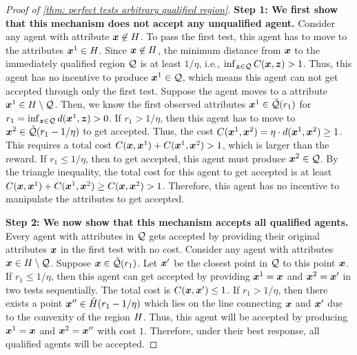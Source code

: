 \begin{proof}[Proof of \cref{thm: perfect tests arbitrary qualified region}]
    \textbf{Step 1: We first show that this mechanism does not accept any unqualified agent.}  Consider any agent with attribute $\boldsymbol{x} \not \in H$.
    To pass the first test, this agent has to move to the attributes $\boldsymbol{x}^1 \in H$. 
    Since $\boldsymbol{x} \not \in H$, the minimum distance from $\boldsymbol{x}$ to the immediately qualified region $\mathcal{Q}$ is at least $1/\eta$, i.e., $\inf_{\boldsymbol{z} \in \mathcal{Q}} C(\boldsymbol{x},\boldsymbol{z})  > 1$. 
    Thus, this agent has no incentive to produce $\boldsymbol{x}^1 \in \mathcal{Q}$, which means this agent can not get accepted through only the first test.
    Suppose the agent moves to a attribute $\boldsymbol{x}^1 \in H \setminus \mathcal{Q}$. Then, we know the first observed attributes $\boldsymbol{x}^1 \in \tilde {\mathcal{Q}}(r_1)$ for $r_1= \inf_{\boldsymbol{z} \in \mathcal{Q}} d(\boldsymbol{x}^1,\boldsymbol{z})  > 0$. If $r_1 > 1/\eta$, then this agent has to move to $\boldsymbol{x}^2 \in \tilde {\mathcal{Q}} (r_1 - 1/\eta)$ to get accepted. Thus, the cost $C(\boldsymbol{x}^1,\boldsymbol{x}^2) = \eta \cdot d(\boldsymbol{x}^1,\boldsymbol{x}^2) \geq 1$. This requires a total cost $C(\boldsymbol{x},\boldsymbol{x}^1) + C(\boldsymbol{x}^1,\boldsymbol{x}^2) > 1$, which is larger than the reward. If $r_1 \leq 1/\eta$, then to get accepted, this agent must produce $\boldsymbol{x}^2 \in \mathcal{Q}$. By the triangle inequality, the total cost for this agent to get accepted is at least $C(\boldsymbol{x},\boldsymbol{x}^1) + C(\boldsymbol{x}^1,\boldsymbol{x}^2) \geq C(\boldsymbol{x}, \boldsymbol{x}^2) > 1$. Therefore, this agent has no incentive to manipulate the attributes to get accepted. 

    \textbf{Step 2: We now show that this mechanism accepts all qualified agents.} Every agent with attributes in $\mathcal{Q}$ gets accepted by providing their original attributes $\boldsymbol{x}$ in the first test with no cost. Consider any agent with attributes $\boldsymbol{x} \in H \setminus \mathcal{Q}$. Suppose $\boldsymbol{x} \in \tilde {\mathcal{Q}}(r_1)$. Let $\boldsymbol{x}'$ be the closest point in $\mathcal{Q}$ to this point $\boldsymbol{x}$. If $r_1 \leq 1/\eta$, then this agent can get accepted by providing $\boldsymbol{x}^1 = \boldsymbol{x}$ and $\boldsymbol{x}^2 = \boldsymbol{x}'$ in two tests sequentially. The total cost is $C(\boldsymbol{x}, \boldsymbol{x}') \leq 1$. If $r_1 > 1/\eta$, then there exists a point $\boldsymbol{x}'' \in \tilde {H}(r_1 - 1/\eta)$ which lies on the line connecting $\boldsymbol{x}$ and $\boldsymbol{x}'$ due to the convexity of the region $H$. Thus, this agent will be accepted by producing $\boldsymbol{x}^1 = \boldsymbol{x}$ and $\boldsymbol{x}^2 = \boldsymbol{x}''$ with cost $1$. Therefore, under their best response, all qualified agents will be accepted. 

\end{proof}


